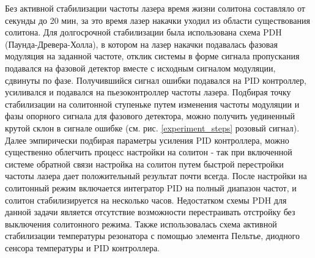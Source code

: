Без активной стабилизации частоты лазера время жизни солитона составляло от секунды до 20 мин, за это время лазер накачки уходил из области существования солитона. Для долгосрочной стабилизации была использована схема PDH (Паунда-Древера-Холла), в котором на лазер накачки подавалась фазовая модуляция на заданной частоте, отклик системы в форме сигнала пропускания подавался на фазовой детектор вместе с исходным сигналом модуляции, сдвинуты по фазе. Получившийся сигнал ошибки подавался на PID контроллер, усиливался и подавался на пьезоконтроллер частоты лазера. Подбирая точку стабилизации на солитонной ступеньке путем изменения частоты модуляции и фазы опорного сигнала для фазового детектора, можно получить уединенный крутой склон в сигнале ошибке (см. рис. \ref{experiment_steps} розовый сигнал). Далее эмпирически подбирая параметры усиления PID контроллера, можно существенно облегчить процесс настройки на солитон - так при включенной системе обратной связи настройка на солитон путем быстрой перестройки частоты лазера дает положительный результат почти всегда. После настройки на солитонный режим включается интегратор PID на полный диапазон частот, и солитон стабилизируется на несколько часов. Недостатком схемы PDH для данной задачи является отсутствие возможности перестраивать отстройку без выключения солитонного режима. Также использовалась схема активной стабилизации температуры резонатора с помощью элемента Пельтье, диодного сенсора температуры и PID контроллера.


